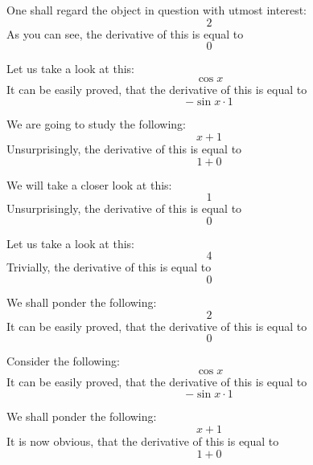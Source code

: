 \documentclass{article}
\begin{document}
One shall regard the object in question with utmost interest:
\begin{equation}
2 
\end{equation}
As you can see, the derivative of this is equal to
\begin{equation}
0 
\end{equation}

Let us take a look at this:
\begin{equation}
\cos x 
\end{equation}
It can be easily proved, that the derivative of this is equal to
\begin{equation}
-\sin x \cdot 1 
\end{equation}

We are going to study the following:
\begin{equation}
x + 1 
\end{equation}
Unsurprisingly, the derivative of this is equal to
\begin{equation}
1 + 0 
\end{equation}

We will take a closer look at this:
\begin{equation}
1 
\end{equation}
Unsurprisingly, the derivative of this is equal to
\begin{equation}
0 
\end{equation}

Let us take a look at this:
\begin{equation}
4 
\end{equation}
Trivially, the derivative of this is equal to
\begin{equation}
0 
\end{equation}

We shall ponder the following:
\begin{equation}
2 
\end{equation}
It can be easily proved, that the derivative of this is equal to
\begin{equation}
0 
\end{equation}

Consider the following:
\begin{equation}
\cos x 
\end{equation}
It can be easily proved, that the derivative of this is equal to
\begin{equation}
-\sin x \cdot 1 
\end{equation}

We shall ponder the following:
\begin{equation}
x + 1 
\end{equation}
It is now obvious, that the derivative of this is equal to
\begin{equation}
1 + 0 
\end{equation}
\end{document}
